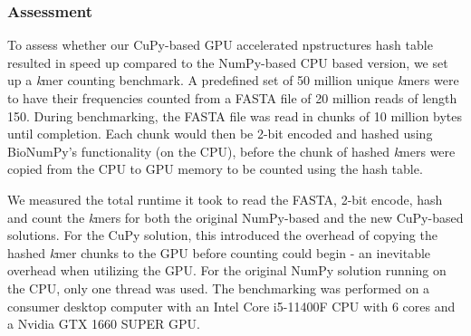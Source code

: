 \subsubsection{Assessment}
To assess whether our CuPy-based GPU accelerated npstructures hash table resulted in speed up compared to the NumPy-based CPU based version, we set up a \textit{k}mer counting benchmark.
A predefined set of 50 million unique \textit{k}mers were to have their frequencies counted from a FASTA file of 20 million reads of length 150.
During benchmarking, the FASTA file was read in chunks of 10 million bytes until completion.
Each chunk would then be 2-bit encoded and hashed using BioNumPy's functionality (on the CPU), before the chunk of hashed \textit{k}mers were copied from the CPU to GPU memory to be counted using the hash table.

We measured the total runtime it took to read the FASTA, 2-bit encode, hash and count the \textit{k}mers for both the original NumPy-based and the new CuPy-based solutions.
For the CuPy solution, this introduced the overhead of copying the hashed \textit{k}mer chunks to the GPU before counting could begin - an inevitable overhead when utilizing the GPU.
For the original NumPy solution running on the CPU, only one thread was used.
The benchmarking was performed on a consumer desktop computer with an Intel Core i5-11400F CPU with 6 cores and a Nvidia GTX 1660 SUPER GPU.

